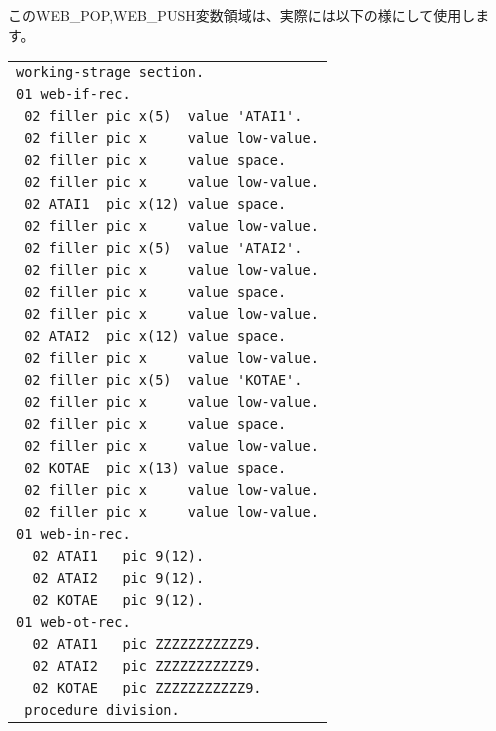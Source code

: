このWEB\_POP,WEB\_PUSH変数領域は、実際には以下の様にして使用します。
\vspace{1em}

{\footnotesize
\begin{tabular}{|l|}
\hline
\verb+working-strage section.+\\
\verb+01 web-if-rec.+\\
\verb+ 02 filler pic x(5)  value 'ATAI1'.+\\
\verb+ 02 filler pic x     value low-value.+\\
\verb+ 02 filler pic x     value space.+\\
\verb+ 02 filler pic x     value low-value.+\\
\verb+ 02 ATAI1  pic x(12) value space.+\\
\verb+ 02 filler pic x     value low-value.+\\
\verb+ 02 filler pic x(5)  value 'ATAI2'.+\\
\verb+ 02 filler pic x     value low-value.+\\
\verb+ 02 filler pic x     value space.+\\
\verb+ 02 filler pic x     value low-value.+\\
\verb+ 02 ATAI2  pic x(12) value space.+\\
\verb+ 02 filler pic x     value low-value.+\\
\verb+ 02 filler pic x(5)  value 'KOTAE'.+\\
\verb+ 02 filler pic x     value low-value.+\\
\verb+ 02 filler pic x     value space.+\\
\verb+ 02 filler pic x     value low-value.+\\
\verb+ 02 KOTAE  pic x(13) value space.+\\
\verb+ 02 filler pic x     value low-value.+\\
\verb+ 02 filler pic x     value low-value.+\\
\verb+01 web-in-rec.+\\
\verb+  02 ATAI1   pic 9(12).+\\
\verb+  02 ATAI2   pic 9(12).+\\
\verb+  02 KOTAE   pic 9(12).+\\
\verb+01 web-ot-rec.+\\
\verb+  02 ATAI1   pic ZZZZZZZZZZZ9.+\\
\verb+  02 ATAI2   pic ZZZZZZZZZZZ9.+\\
\verb+  02 KOTAE   pic ZZZZZZZZZZZ9.+\\
\verb+ procedure division.+\\

\end{tabular}}
